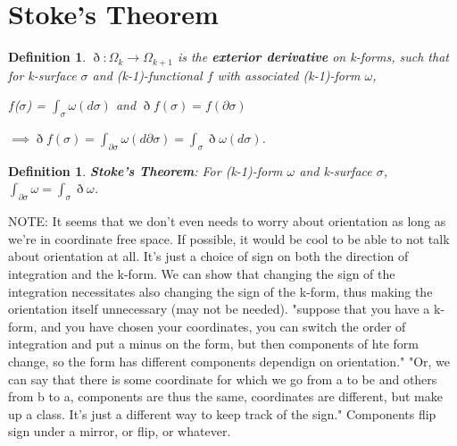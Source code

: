 \documentclass{book}
\newtheorem{defn}[equation]{Definition}
\begin{document}
\section{Stoke's Theorem}



\begin{defn}
	$\eth : \Omega_k \to \Omega_{k+1}$ is the \textbf{exterior derivative} on k-forms, such that for k-surface $\sigma$ and (k-1)-functional $f$ with associated (k-1)-form $\omega$, 
	
	$f$($\sigma$) = $\int_{\sigma}\omega(d\sigma)$ and $\eth f(\sigma) = f(\partial\sigma)$
	
	$\implies \eth f(\sigma) = \int_{\partial\sigma} \omega(d\partial\sigma) = \int_{\sigma} \eth\omega(d\sigma)$. 
\end{defn}




 



\begin{defn}
	\textbf{Stoke's Theorem}: For (k-1)-form $\omega$ and k-surface $\sigma$, $\int_{\partial \sigma}\omega = \int_{\sigma}\eth\omega$. 
\end{defn}

NOTE: It seems that we don't even needs to worry about orientation as long as we're in coordinate free space. If possible, it would be cool to be able to not talk about orientation at all. It's just a choice of sign on both the direction of integration and the k-form. We can show that changing the sign of the integration necessitates also changing the sign of the k-form, thus making the orientation itself unnecessary (may not be needed). "suppose that you have a k-form, and you have chosen your coordinates, you can switch the order of integration and put a minus on the form, but then components of hte form change, so the form has different components dependign on orientation." "Or, we can say that there is some coordinate for which we go from a to be and others from b to a, components are thus the same, coordinates are different, but make up a class. It's just a different way to keep track of the sign." Components flip sign under a mirror, or flip, or whatever. 
\end{document}
